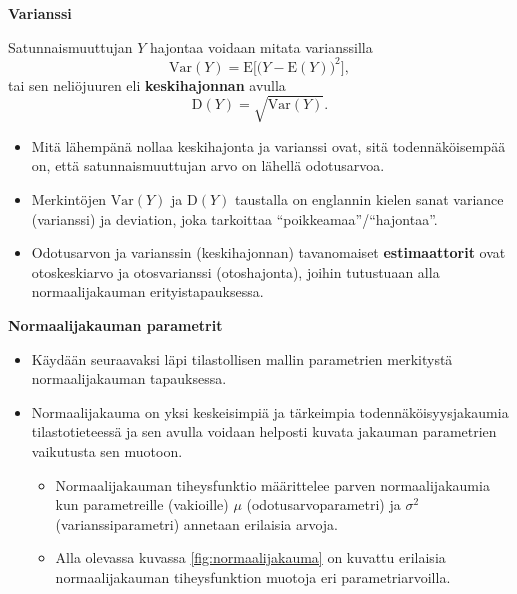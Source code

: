 \documentclass[
]{book}
\providecommand{\tightlist}{%
  \setlength{\itemsep}{0pt}\setlength{\parskip}{0pt}}
\begin{document}
\begin{defblock}{}

\textbf{Varianssi}

Satunnaismuuttujan \(Y\) hajontaa voidaan mitata varianssilla
\[
\mathrm{Var}(Y) = \text{E}\Big[\Big(Y-\text{E}(Y)\Big)^2\Big],
\]
tai sen neliöjuuren eli \textbf{keskihajonnan} avulla
\[
\text{D}(Y) = \sqrt{\mathrm{Var}(Y)}.
\]

\begin{itemize}
\tightlist
\item
  Mitä lähempänä nollaa keskihajonta ja varianssi ovat, sitä todennäköisempää on, että satunnaismuuttujan arvo on lähellä odotusarvoa.
\item
  Merkintöjen \(\mathrm{Var}(Y)\) ja \(\text{D}(Y)\) taustalla on englannin kielen sanat variance (varianssi) ja deviation, joka tarkoittaa ``poikkeamaa''/``hajontaa''.
\end{itemize}

\end{defblock}

\begin{itemize}
\tightlist
\item
  Odotusarvon ja varianssin (keskihajonnan) tavanomaiset \textbf{estimaattorit} ovat otoskeskiarvo ja otosvarianssi (otoshajonta), joihin tutustuaan alla normaalijakauman erityistapauksessa.
\end{itemize}

\textbf{Normaalijakauman parametrit}

\begin{itemize}
\tightlist
\item
  Käydään seuraavaksi läpi tilastollisen mallin parametrien merkitystä normaalijakauman tapauksessa.
\item
  Normaalijakauma on yksi keskeisimpiä ja tärkeimpia todennäköisyysjakaumia tilastotieteessä ja sen avulla voidaan helposti kuvata jakauman parametrien vaikutusta sen muotoon.

  \begin{itemize}
  \tightlist
  \item
    Normaalijakauman tiheysfunktio määrittelee parven normaalijakaumia kun parametreille (vakioille) \(\mu\) (odotusarvoparametri) ja \(\sigma^2\) (varianssiparametri) annetaan erilaisia arvoja.
  \item
    Alla olevassa kuvassa \ref{fig:normaalijakauma} on kuvattu erilaisia normaalijakauman tiheysfunktion muotoja eri parametriarvoilla.
  \end{itemize}
\end{itemize}
\end{document}
